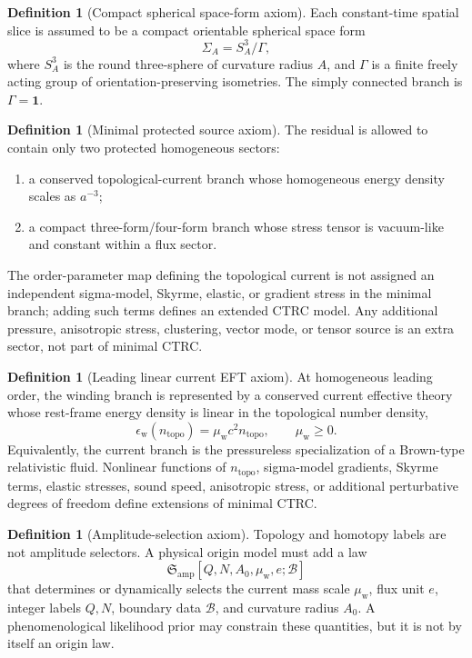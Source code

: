 \documentclass[
  aps,
  prd,
  reprint,
  superscriptaddress,
  floatfix,
  nofootinbib,
  longbibliography
]{revtex4-2}
\theoremstyle{plain}
\theoremstyle{definition}
\newtheorem{definition}[theorem]{Definition}
\theoremstyle{remark}
\newcommand{\w}{\mathrm w}
\newcommand{\topo}{\mathrm{topo}}
\newcommand{\amp}{\mathrm{amp}}
\newcommand{\id}{\mathbf 1}
\newcommand{\eps}{\epsilon}
\begin{document}
\begin{definition}[Compact spherical space-form axiom]
Each constant-time spatial slice is assumed to be a compact orientable spherical space form
\begin{equation}
\Sigma_A=S^3_A/\Gamma ,
\label{eq:spherical_space_form}
\end{equation}
where \(S^3_A\) is the round three-sphere of curvature radius \(A\), and \(\Gamma\) is a finite freely acting group of orientation-preserving isometries.  The simply connected branch is \(\Gamma=\id\).
\end{definition}

\begin{definition}[Minimal protected source axiom]
The residual is allowed to contain only two protected homogeneous sectors:
\begin{enumerate}
\item a conserved topological-current branch whose homogeneous energy density scales as \(a^{-3}\);
\item a compact three-form/four-form branch whose stress tensor is vacuum-like and constant within a flux sector.
\end{enumerate}
The order-parameter map defining the topological current is not assigned an
independent sigma-model, Skyrme, elastic, or gradient stress in the minimal
branch; adding such terms defines an extended CTRC model.  Any additional
pressure, anisotropic stress, clustering, vector mode, or tensor source is an
extra sector, not part of minimal CTRC.
\end{definition}

\begin{definition}[Leading linear current EFT axiom]
At homogeneous leading order, the winding branch is represented by a conserved
current effective theory whose rest-frame energy density is linear in the
topological number density,
\begin{equation}
\eps_{\w}(n_{\topo})=\mu_{\w}c^2 n_{\topo},
\qquad
\mu_{\w}\ge0 .
\label{eq:leading_current_eft_axiom}
\end{equation}
Equivalently, the current branch is the pressureless specialization of a
Brown-type relativistic fluid.  Nonlinear functions of \(n_{\topo}\),
sigma-model gradients, Skyrme terms, elastic stresses, sound speed,
anisotropic stress, or additional perturbative degrees of freedom define
extensions of minimal CTRC.
\end{definition}

\begin{definition}[Amplitude-selection axiom]
Topology and homotopy labels are not amplitude selectors.  A physical origin model must add a law
\begin{equation}
\mathfrak S_{\amp}[Q,N,A_0,\mu_{\w},e;\mathcal B]
\label{eq:amplitude_selector_symbolic}
\end{equation}
that determines or dynamically selects the current mass scale \(\mu_{\w}\),
flux unit \(e\), integer labels \(Q,N\), boundary data \(\mathcal B\), and
curvature radius \(A_0\).  A phenomenological likelihood prior may constrain
these quantities, but it is not by itself an origin law.
\end{definition}
\end{document}
